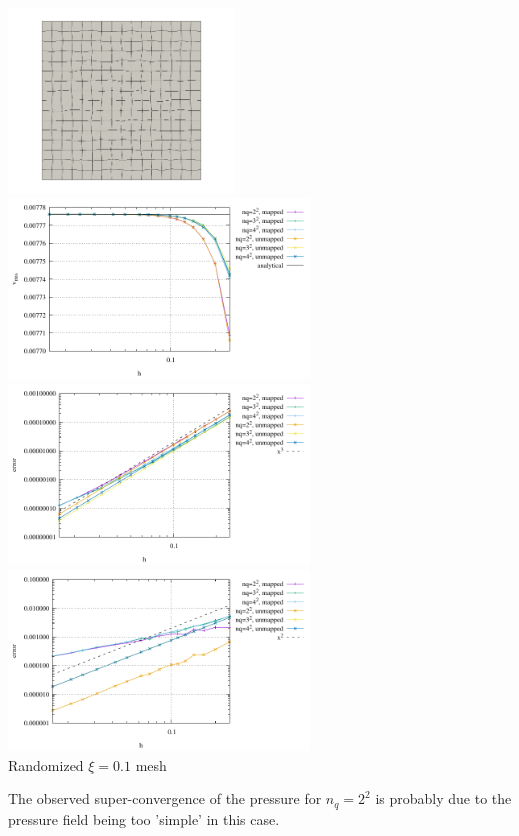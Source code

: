 \begin{center}
\includegraphics[width=6cm]{python_codes/fieldstone_76/results/dh/rand/mesh_rand}
\includegraphics[width=8cm]{python_codes/fieldstone_76/results/dh/rand/vrms}\\
\includegraphics[width=8cm]{python_codes/fieldstone_76/results/dh/rand/errors_V}
\includegraphics[width=8cm]{python_codes/fieldstone_76/results/dh/rand/errors_P}\\
{\captionfont Randomized $\xi=0.1$ mesh}
\end{center}

The observed super-convergence of the pressure for $n_q=2^2$ is probably due to the 
pressure field being too 'simple' in this case.

